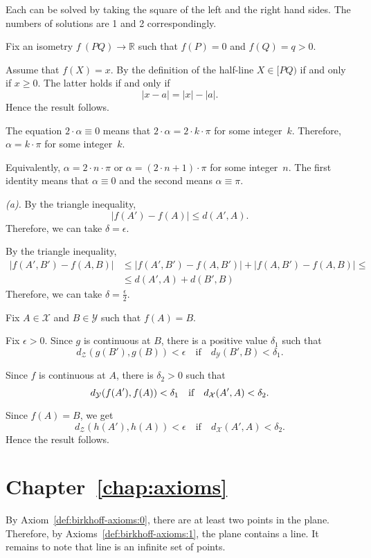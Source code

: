 Each can be solved by taking the square of the left and the right hand sides.
The numbers of solutions are 1 and 2 correspondingly.

Fix an isometry $f\:(P Q)\to \mathbb{R}$ such that $f(P)=0$ and $f(Q)=q>0$.

Assume that $f(X)=x$.
By the definition of the half-line $X\in[PQ)$ if and only if $x\ge 0$.
The latter holds if and only if 
\[|x-a|=|x|-|a|.\]
Hence the result follows.


The equation
$2\cdot\alpha\equiv 0$
means that $2\cdot\alpha=2\cdot k\cdot\pi$ for some integer~$k$.
Therefore,
$\alpha=k\cdot\pi$ for some integer~$k$.

Equivalently, $\alpha=2\cdot n\cdot \pi$ or $\alpha=(2\cdot n+1)\cdot \pi$ for some integer~$n$.
The first identity means that $\alpha\equiv 0$ and the second means $\alpha\equiv \pi$.

 \textit{(a).}
By the triangle inequality,
$$|f(A')-f(A)|\le d(A',A).$$
Therefore, we can take $\delta=\epsilon$.

By the triangle inequality,
\begin{align*}
|f(A',B')-f(A,B)|
&\le |f(A',B')-f(A,B')|
+|f(A,B')-f(A,B)|
\le
\\
&\le d(A',A)+d(B',B)
\end{align*}
Therefore, we can take $\delta=\tfrac\epsilon2$.

Fix $A\in \mathcal{X}$ and $B\in\mathcal{Y}$
such that $f(A)=B$.

Fix $\epsilon>0$.
Since $g$ is continuous at $B$, there is a positive value $\delta_1$ such that 
$$d_{\mathcal{Z}}(g(B'),g(B))<\epsilon
\quad
\text{if}
\quad
d_{\mathcal{Y}}(B',B)<\delta_1.$$ 

Since $f$ is continuous at $A$, there is $\delta_2>0$ such that 
$$d_{\mathcal{Y}}(f(A'),f(A))\z<\delta_1
\quad
\text{if}
\quad
d_{\mathcal{X}}(A',A)<\delta_2.$$ 

Since $f(A)=B$, we get
$$d_{\mathcal{Z}}(h(A'),h(A))<\epsilon
\quad
\text{if}
\quad
d_{\mathcal{X}}(A',A)<\delta_2.$$ 
Hence the result follows.


\section*{Chapter~\ref{chap:axioms}}
\setcounter{eqtn}{0}

 By Axiom~\ref{def:birkhoff-axioms:0}, there are at least two points in the plane.
Therefore, by Axioms~\ref{def:birkhoff-axioms:1}, 
the plane contains a line. 
It remains to note that line is an infinite set of points.

